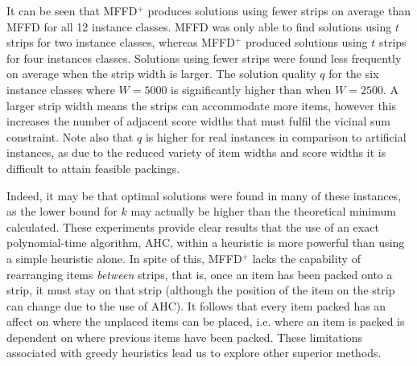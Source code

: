 \documentclass{elsarticle}
\begin{document}
It can be seen that MFFD$^+$ produces solutions using fewer strips on average than MFFD for all 12 instance classes. MFFD was only able to find solutions using $t$ strips for two instance classes, whereas MFFD$^+$ produced solutions using $t$ strips for four instances classes. Solutions using fewer strips were found less frequently on average when the strip width is larger. The solution quality $q$ for the six instance classes where $W = 5000$ is significantly higher than when $W = 2500$. A larger strip width means the strips can accommodate more items, however this increases the number of adjacent score widths that must fulfil the vicinal sum constraint. Note also that $q$ is higher for real instances in comparison to artificial instances, as due to the reduced variety of item widths and score widths it is difficult to attain feasible packings. 

Indeed, it may be that optimal solutions were found in many of these instances, as the lower bound for $k$ may actually be higher than the theoretical minimum calculated. These experiments provide clear results that the use of an exact polynomial-time algorithm, AHC, within a heuristic is more powerful than using a simple heuristic alone. In spite of this, MFFD$^+$ lacks the capability of rearranging items \emph{between} strips, that is, once an item has been packed onto a strip, it must stay on that strip (although the position of the item on the strip can change due to the use of AHC). It follows that every item packed has an affect on where the unplaced items can be placed, i.e. where an item is packed is dependent on where previous items have been packed. These limitations associated with greedy heuristics lead us to explore other superior methods.
\end{document}

